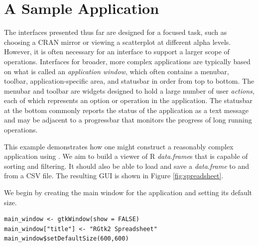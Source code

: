 \documentclass[article]{jss}
\begin{document}
\section{A Sample Application}\label{sec:spreadsheet-example}

The interfaces presented thus far are designed for a focused task, such as 
choosing a CRAN mirror or viewing a scatterplot at different alpha levels.
However, it is often necessary for an interface to support a larger scope of
operations. Interfaces for broader, more complex applications are typically based on 
what is called an \emph{application window}, which often contains a menubar, 
toolbar, application-specific area, and statusbar in order from top to bottom. The
menubar and toolbar are widgets designed to hold a large number of user 
\emph{actions}, each of which represents an option or operation in the application.
The statusbar at the bottom commonly reports the status of the application
as a text message and may be adjacent to a progressbar that monitors
the progress of long running operations.

This example demonstrates how one might construct a reasonably complex
application using . We aim to build a viewer of R \emph{data.frame}s that
is capable of sorting and filtering. It should also be able to load and save
a \emph{data.frame} to and from a CSV file. The resulting GUI is shown in Figure
\ref{fig:spreadsheet}.

We begin by creating the main window for the application and setting its default size.
\begin{verbatim}
main_window <- gtkWindow(show = FALSE)
main_window["title"] <- "RGtk2 Spreadsheet"
main_window$setDefaultSize(600,600)
\end{verbatim}
\end{document}
